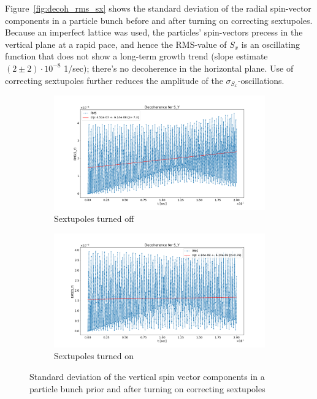 \documentclass[a4paper]{jacow}
\begin{document}
Figure~\ref{fig:decoh_rms_sx} shows the standard deviation of the radial spin-vector components in a particle bunch before and after turning on correcting sextupoles. Because an imperfect lattice was used, the particles' spin-vectors precess in the vertical plane at a rapid pace, and hence the RMS-value of $S_x$ is an oscillating function that does not show a long-term growth trend (slope estimate $(2 \pm 2)\cdot 10^{-8}$ 1/sec); there's no decoherence in the horizontal plane. Use of correcting sextupoles further reduces the amplitude of the $\sigma_{S_x}$-oscillations.

\begin{figure}[h!]
  \centering
  \begin{subfigure}{\linewidth}
    \centering
    \includegraphics[width=\linewidth]{../img/IPAC19/SY_decoh_20sec_unopt}
    \caption{Sextupoles turned off\label{fig:decoh_rms_sy_unopt}}
  \end{subfigure}
  \begin{subfigure}{\linewidth}
    \centering
    \includegraphics[width=\linewidth]{../img/IPAC19/SY_decoh_20sec_opt}
    \caption{Sextupoles turned on\label{fig:decoh_rms_sy_opt}}
  \end{subfigure}
  \caption{Standard deviation of the vertical spin vector components in a particle bunch prior and after turning on correcting sextupoles\label{fig:decoh_rms_sy}}
\end{figure}
\end{document}
